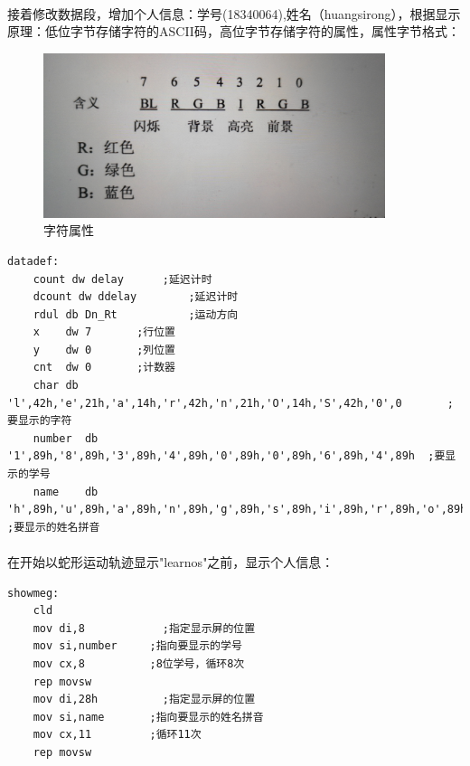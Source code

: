 \documentclass[12pt]{article}
\begin{document}
	\paragraph{}接着修改数据段，增加个人信息：学号(18340064),姓名（huangsirong），根据显示原理：低位字节存储字符的ASCII码，高位字节存储字符的属性，属性字节格式：		
	\begin{figure}[H]
			\centering
			\includegraphics[width=10cm]{./figures/ascii.jpg}
			\caption{字符属性} 
		\end{figure}	

	\begin{lstlisting}
datadef:	
    count dw delay		;延迟计时
    dcount dw ddelay		;延迟计时
    rdul db Dn_Rt			;运动方向
    x    dw 7		;行位置
    y    dw 0		;列位置
    cnt  dw 0		;计数器
    char db 'l',42h,'e',21h,'a',14h,'r',42h,'n',21h,'O',14h,'S',42h,'0',0		;要显示的字符
    number  db	'1',89h,'8',89h,'3',89h,'4',89h,'0',89h,'0',89h,'6',89h,'4',89h  ;要显示的学号
    name	db 'h',89h,'u',89h,'a',89h,'n',89h,'g',89h,'s',89h,'i',89h,'r',89h,'o',89h,'n',89h,'g',89h ;要显示的姓名拼音
	\end{lstlisting}

	\paragraph{}在开始以蛇形运动轨迹显示"learnos"之前，显示个人信息：
	\begin{lstlisting}
showmeg:
	cld
	mov	di,8	 		;指定显示屏的位置
	mov si,number     ;指向要显示的学号
	mov cx,8          ;8位学号，循环8次
	rep movsw
	mov di,28h  		;指定显示屏的位置
	mov si,name       ;指向要显示的姓名拼音
	mov cx,11         ;循环11次
	rep movsw
	\end{lstlisting}
\end{document}
